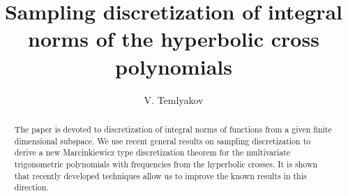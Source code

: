 \documentclass[12pt]{article}
\date{}
\numberwithin{equation}{section}
\begin{document}
\title{Sampling discretization of integral norms of the hyperbolic cross polynomials}
\author{V. Temlyakov}


\newcommand{\Addresses}{{%
  \bigskip
  \footnotesize








  V.N. Temlyakov, \textsc{University of South Carolina,\\ Steklov Institute of Mathematics,\\ and Lomonosov Moscow State University
  \\
E-mail:} \texttt{temlyak@math.sc.edu}



}}


\maketitle
\begin{abstract}
{The paper is devoted to discretization of integral norms of functions from
a given finite dimensional subspace. We use recent general results on sampling discretization to derive a new Marcinkiewicz type
   discretization theorem for  the multivariate trigonometric polynomials with frequencies from the hyperbolic crosses. It is shown that recently developed techniques allow us to improve the known results in this direction.
  }
\end{abstract}
\end{document}
